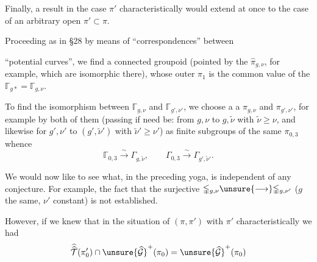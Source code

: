 Finally, a result in the case $\pi'$ characteristically  would extend at once to the case of an arbitrary open $\pi'\subset\pi$.

Proceeding  as in \S 28 by means of ``correspondences''  between


``potential curves'', we find a connected groupoid (pointed by the $\widehat{\pi}_{g,\nu}$, for example, \deleted{\unsure{)}} which are  isomorphic there), whose outer $\pi_1$ is the common value of the $\mathbb{\Gamma}_{g*}=\mathbb{\Gamma}_{g,\nu}$.

To find  the isomorphism  between $\mathbb{\Gamma}_{g,\nu}$ and $\mathbb{\Gamma}_{g',\nu'}$, we choose a   a $\pi_{g,\nu}$ and $\pi_{g',\nu'}$, for example by   both of them (passing if need be: from $g,\nu$ to $g,\widetilde{\nu}$ with $\widetilde{\nu}\geq\nu$, and likewise for $g',\nu'$ to $(g',\widetilde{\nu}')$ with $\widetilde{\nu}'\geq\nu'$) as finite subgroups of the same $\pi_{0,3}$  whence
\[
\mathbb{\Gamma}_{0,3}\xrightarrow{\sim}\Gamma_{g,\widetilde{\nu}},
\qquad
\Gamma_{0,3}\xrightarrow{\sim}\Gamma_{g',\widetilde{\nu}'}.
\]

We would now like to see what, in the preceding yoga, is independent of any conjecture. For example, the fact that the surjective   $\mathbb{\Gamma}_{g,\nu}\unsure{\longrightarrow}\mathbb{\Gamma}_{g,\nu'}$ ($g$ the same, $\nu'$ constant) is not established.

However, if we knew that in the situation of $(\pi,\pi')$ with $\pi'$ characteristically  we had
\[
\widehat{\widehat{\mathcal T}}(\pi'_0)\cap
\unsure{\widehat{\mathcal G}}^{+}(\pi_0)
=
\unsure{\widehat{\mathcal G}}^{+}(\pi_0)
\]


